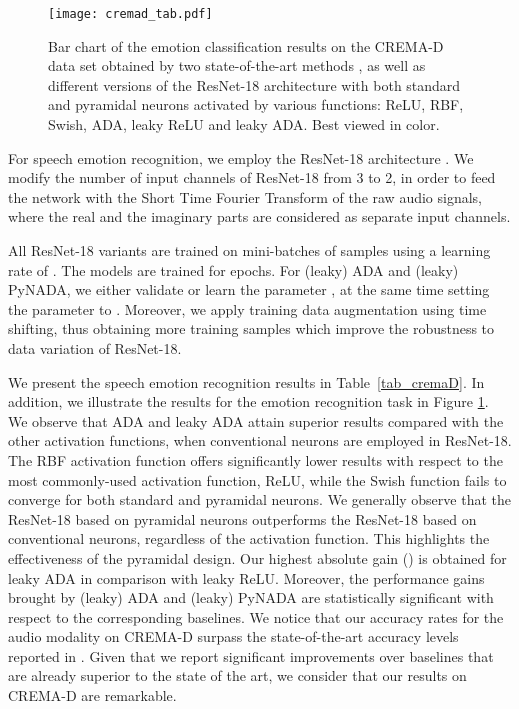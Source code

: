 \documentclass[pdflatex,sn-mathphys]{sn-jnl}
\theoremstyle{thmstyleone}
\theoremstyle{thmstyletwo}\newtheorem{example}{Example}\newtheorem{remark}{Remark}
\theoremstyle{thmstylethree}\newtheorem{definition}{Definition}\DeclareMathOperator{\sinc}{sinc}
\begin{document}
\begin{figure}[!t]
\begin{center}
\centerline{\texttt{[image: cremad\_tab.pdf]}}
\caption{Bar chart of the emotion classification results on the CREMA-D data set obtained by two state-of-the-art methods \citep{Shukla-ICASSP-2020,He-CVPRW-2020}, as well as different versions of the ResNet-18 architecture with both standard and pyramidal neurons activated by various functions: ReLU, RBF, Swish, ADA, leaky ReLU and leaky ADA. Best viewed in color.}
\label{fig_tab_cremad}
\end{center}
\end{figure}

For speech emotion recognition, we employ the ResNet-18 architecture \citep{He-CVPR-2016}. We modify the number of input channels of ResNet-18 from 3 to 2, in order to feed the network with the Short Time Fourier Transform of the raw audio signals, where the real and the imaginary parts are considered as separate input channels.

All ResNet-18 variants are trained on mini-batches of  samples using a learning rate of . The models are trained for  epochs. For (leaky) ADA and (leaky) PyNADA, we either validate or learn the parameter , at the same time setting the parameter  to . Moreover, we apply training data augmentation using time shifting, thus obtaining more training samples which improve the robustness to data variation of ResNet-18.
 
We present the speech emotion recognition results in Table~\ref{tab_cremaD}. In addition, we illustrate the results for the emotion recognition task in Figure \ref{fig_tab_cremad}. We observe that ADA and leaky ADA attain superior results compared with the other activation functions, when conventional neurons are employed in ResNet-18. The RBF activation function offers significantly lower results with respect to the most commonly-used activation function, ReLU, while the Swish function fails to converge for both standard and pyramidal neurons. We generally observe that the ResNet-18 based on pyramidal neurons outperforms the ResNet-18 based on conventional neurons, regardless of the activation function. This highlights the effectiveness of the pyramidal design. Our highest absolute gain () is obtained for leaky ADA in comparison with leaky ReLU. Moreover, the performance gains brought by (leaky) ADA and (leaky) PyNADA are statistically significant with respect to the corresponding baselines. We notice that our accuracy rates for the audio modality on CREMA-D surpass the  state-of-the-art accuracy levels reported in \citep{Shukla-ICASSP-2020,He-CVPRW-2020}. Given that we report significant improvements over baselines that are already superior to the state of the art, we consider that our results on CREMA-D are remarkable. 
\end{document}
